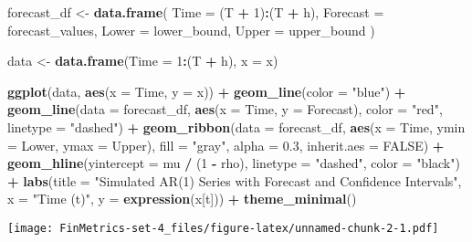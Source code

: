 \documentclass[
]{article}
\newenvironment{Shaded}{\begin{snugshade}}{\end{snugshade}}
\newcommand{\AttributeTok}[1]{\textcolor[rgb]{0.13,0.29,0.53}{#1}}
\newcommand{\ConstantTok}[1]{\textcolor[rgb]{0.56,0.35,0.01}{#1}}
\newcommand{\DecValTok}[1]{\textcolor[rgb]{0.00,0.00,0.81}{#1}}
\newcommand{\FloatTok}[1]{\textcolor[rgb]{0.00,0.00,0.81}{#1}}
\newcommand{\FunctionTok}[1]{\textcolor[rgb]{0.13,0.29,0.53}{\textbf{#1}}}
\newcommand{\NormalTok}[1]{#1}
\newcommand{\OtherTok}[1]{\textcolor[rgb]{0.56,0.35,0.01}{#1}}
\newcommand{\SpecialCharTok}[1]{\textcolor[rgb]{0.81,0.36,0.00}{\textbf{#1}}}
\newcommand{\StringTok}[1]{\textcolor[rgb]{0.31,0.60,0.02}{#1}}
\begin{document}
\begin{Shaded}
\begin{Highlighting}[]
\NormalTok{forecast\_df }\OtherTok{\textless{}{-}} \FunctionTok{data.frame}\NormalTok{(}
  \AttributeTok{Time =}\NormalTok{ (T }\SpecialCharTok{+} \DecValTok{1}\NormalTok{)}\SpecialCharTok{:}\NormalTok{(T }\SpecialCharTok{+}\NormalTok{ h),}
  \AttributeTok{Forecast =}\NormalTok{ forecast\_values,}
  \AttributeTok{Lower =}\NormalTok{ lower\_bound,}
  \AttributeTok{Upper =}\NormalTok{ upper\_bound}
\NormalTok{)}

\NormalTok{data }\OtherTok{\textless{}{-}} \FunctionTok{data.frame}\NormalTok{(}\AttributeTok{Time =} \DecValTok{1}\SpecialCharTok{:}\NormalTok{(T }\SpecialCharTok{+}\NormalTok{ h), }\AttributeTok{x =}\NormalTok{ x)}

\FunctionTok{ggplot}\NormalTok{(data, }\FunctionTok{aes}\NormalTok{(}\AttributeTok{x =}\NormalTok{ Time, }\AttributeTok{y =}\NormalTok{ x)) }\SpecialCharTok{+}
  \FunctionTok{geom\_line}\NormalTok{(}\AttributeTok{color =} \StringTok{"blue"}\NormalTok{) }\SpecialCharTok{+}
  \FunctionTok{geom\_line}\NormalTok{(}\AttributeTok{data =}\NormalTok{ forecast\_df, }\FunctionTok{aes}\NormalTok{(}\AttributeTok{x =}\NormalTok{ Time, }\AttributeTok{y =}\NormalTok{ Forecast), }\AttributeTok{color =} \StringTok{"red"}\NormalTok{, }\AttributeTok{linetype =} \StringTok{"dashed"}\NormalTok{) }\SpecialCharTok{+}
  \FunctionTok{geom\_ribbon}\NormalTok{(}\AttributeTok{data =}\NormalTok{ forecast\_df, }\FunctionTok{aes}\NormalTok{(}\AttributeTok{x =}\NormalTok{ Time, }\AttributeTok{ymin =}\NormalTok{ Lower, }\AttributeTok{ymax =}\NormalTok{ Upper),}
              \AttributeTok{fill =} \StringTok{"gray"}\NormalTok{, }\AttributeTok{alpha =} \FloatTok{0.3}\NormalTok{, }\AttributeTok{inherit.aes =} \ConstantTok{FALSE}\NormalTok{) }\SpecialCharTok{+}
  \FunctionTok{geom\_hline}\NormalTok{(}\AttributeTok{yintercept =}\NormalTok{ mu }\SpecialCharTok{/}\NormalTok{ (}\DecValTok{1} \SpecialCharTok{{-}}\NormalTok{ rho), }\AttributeTok{linetype =} \StringTok{"dashed"}\NormalTok{, }\AttributeTok{color =} \StringTok{"black"}\NormalTok{) }\SpecialCharTok{+}
  \FunctionTok{labs}\NormalTok{(}\AttributeTok{title =} \StringTok{"Simulated AR(1) Series with Forecast and Confidence Intervals"}\NormalTok{,}
       \AttributeTok{x =} \StringTok{"Time (t)"}\NormalTok{, }\AttributeTok{y =} \FunctionTok{expression}\NormalTok{(x[t])) }\SpecialCharTok{+}
  \FunctionTok{theme\_minimal}\NormalTok{()}
\end{Highlighting}
\end{Shaded}

\texttt{[image: FinMetrics-set-4\_files/figure-latex/unnamed-chunk-2-1.pdf]}
\end{document}
